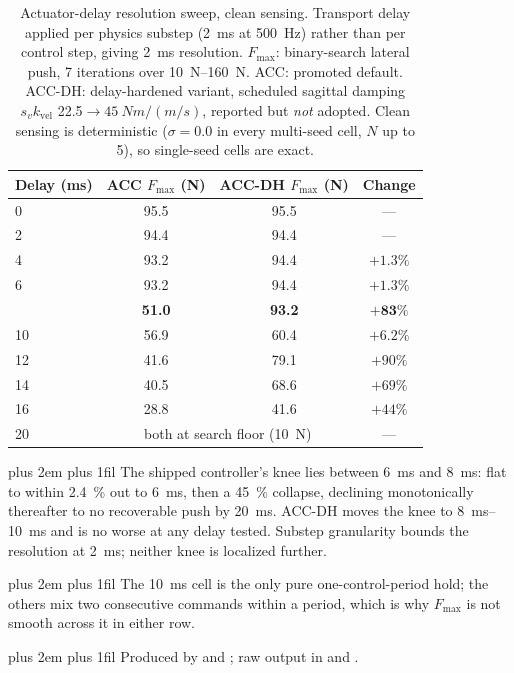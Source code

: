 \documentclass[a4paper,fleqn]{cas-dc}
\newcommand{\tabnote}{\par\leftskip=0pt\rightskip=0pt plus 2em%
  \parfillskip=0pt plus 1fil\relax}
\begin{document}
\begin{table}[pos=!tbp]
\centering
\caption{Actuator-delay resolution sweep, clean sensing. Transport delay applied per physics substep (\SI{2}{ms} at \SI{500}{Hz}) rather than per control step, giving \SI{2}{ms} resolution. $F_{\max}$: binary-search lateral push, \num{7} iterations over \SIrange{10}{160}{N}. ACC: promoted default. ACC-DH: delay-hardened variant, scheduled sagittal damping $s_v k_{\text{vel}}$ \SI{22.5}{}${\rightarrow}\SI{45}{Nm/(m/s)}$, reported but \emph{not} adopted. Clean sensing is deterministic ($\sigma{=}\num{0.0}$ in every multi-seed cell, $N$ up to \num{5}), so single-seed cells are exact.}
\label{tab:delay_cliff}
\footnotesize
\begin{tabular}{@{}lccc@{}}
\toprule
Delay (ms) & ACC $F_{\max}$ (N) & ACC-DH $F_{\max}$ (N) & Change \\
\midrule
0  & 95.5 & 95.5 & --- \\
2  & 94.4 & 94.4 & --- \\
4  & 93.2 & 94.4 & $+1.3\%$ \\
6  & 93.2 & 94.4 & $+1.3\%$ \\
\addlinespace
8  & \textbf{51.0} & \textbf{93.2} & $\mathbf{+83\%}$ \\
10 & 56.9 & 60.4 & $+6.2\%$ \\
12 & 41.6 & 79.1 & $+90\%$ \\
14 & 40.5 & 68.6 & $+69\%$ \\
16 & 28.8 & 41.6 & $+44\%$ \\
20 & \multicolumn{2}{c}{both at search floor (\SI{10}{N})} & --- \\
\bottomrule
\end{tabular}
\vspace{2pt}\tabnote\noindent
The shipped controller's knee lies between \SI{6}{ms} and \SI{8}{ms}: flat to within \SI{2.4}{\percent} out to \SI{6}{ms}, then a \SI{45}{\percent} collapse, declining monotonically thereafter to no recoverable push by \SI{20}{ms}. ACC-DH moves the knee to \SIrange{8}{10}{ms} and is no worse at any delay tested. Substep granularity bounds the resolution at \SI{2}{ms}; neither knee is localized further.
\tabnote\noindent
The \SI{10}{ms} cell is the only pure one-control-period hold; the others mix two consecutive commands within a period, which is why $F_{\max}$ is not smooth across it in either row.
\tabnote\noindent
Produced by  and
; raw output in
 and .
\end{table}
\end{document}
